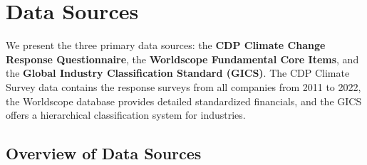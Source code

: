\chapter{Data Sources}
\label{ch:data-sources}

\begin{keytakeaway}
  We present the three primary data sources: the \textbf{CDP Climate Change Response Questionnaire}, the \textbf{Worldscope Fundamental Core Items}, and the \textbf{Global Industry Classification Standard (GICS)}. The CDP Climate Survey data contains the response surveys from all companies from 2011 to 2022, the Worldscope database provides detailed standardized financials, and the GICS offers a hierarchical classification system for industries.
\end{keytakeaway}




\section{Overview of Data Sources}

